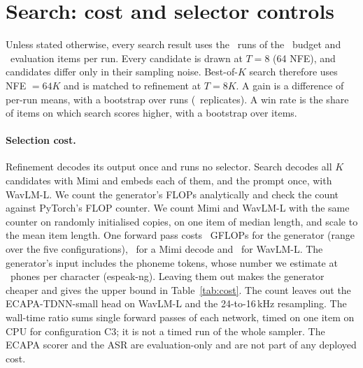 \section{Search: cost and selector controls}
\label{app:search}
Unless stated otherwise, every search result uses the \NmencRuns\ runs of the \Nbudgetc\ budget and
\NmencItems\ evaluation items per run. Every candidate is drawn at $T{=}8$ (64 NFE), and candidates
differ only in their sampling noise. Best-of-$K$ search therefore uses NFE $=64K$ and is
matched to refinement at $T{=}8K$. A gain is a difference of per-run means, with a bootstrap
over runs (\Nbootreps\ replicates). A win rate is the share of items on which search scores
higher, with a bootstrap over items.

\paragraph{Selection cost.}
Refinement decodes its output once and runs no selector. Search decodes all $K$ candidates
with Mimi and embeds each of them, and the prompt once, with WavLM-L. We count the
generator's FLOPs analytically and check the count against PyTorch's FLOP counter. We count
Mimi and WavLM-L with the same counter on randomly initialised copies, on one item of median
length, and scale to the mean item length. One forward pass costs \NcrGenGflops\ GFLOPs for
the generator (range over the five configurations), \NcrMimiGflops\ for a Mimi decode and
\NcrWavlmGflops\ for WavLM-L. The generator's input includes the phoneme tokens, whose
number we estimate at \NcrPhonPerChar\ phones per character (espeak-ng). Leaving them out
makes the generator cheaper and gives the upper bound in Table~\ref{tab:cost}. The count
leaves out the ECAPA-TDNN-small head on WavLM-L and the 24-to-16\,kHz resampling. The
wall-time ratio sums single forward passes of each network, timed on one item on CPU for
configuration C3; it is not a timed run of the whole sampler. The ECAPA scorer and the ASR
are evaluation-only and are not part of any deployed cost.

